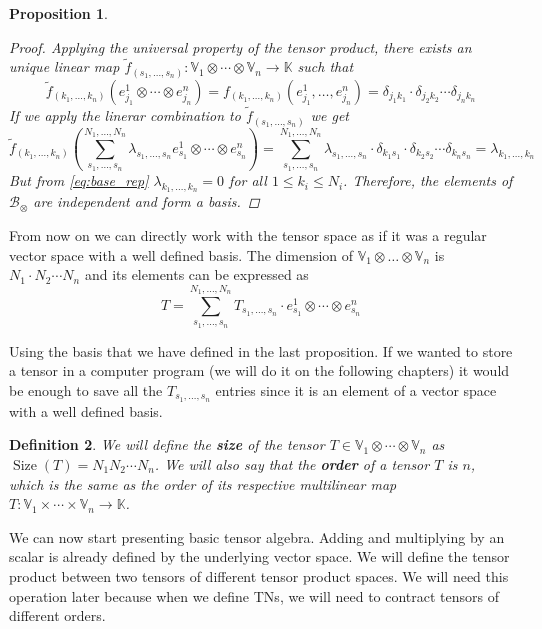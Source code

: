 \documentclass[11pt,a4paper,openright,oneside]{book}
\numberwithin{equation}{section}
\newtheorem{defn0}{Definition}[chapter]
\newtheorem{prop0}[defn0]{Proposition}
\newenvironment{definition}{ \begin{defn0}}{\end{defn0}}
\newenvironment{proposition}{\bigskip \begin{prop0}}{\end{prop0}}
\DeclareMathOperator{\size}{Size}
\begin{document}
\begin{proposition}
\begin{proof}
Applying the universal property of the tensor product, there exists an unique linear map $\tilde f_{(s_1, \dots, s_n)} : \mathbb{V}_1 \otimes \cdots \otimes \mathbb{V}_n \rightarrow \mathbb{K}$
such that
$$\tilde f_{(k_1, \dots, k_n)}(e_{j_1}^1 \otimes \cdots \otimes e_{j_n}^n) = f_{(k_1, \dots, k_n)}(e_{j_1}^1, \dots, e_{j_n}^n) = \delta_{j_1 k_1} \cdot \delta_{j_2 k_2} \cdots \delta_{j_n k_n}$$
If we apply the linerar combination to $\tilde f_{(s_1, \dots, s_n)}$ we get
$$\tilde f_{(k_1, \dots, k_n)} \left( 
\sum_{s_1, \dots, s_n}^{N_1, \dots, N_n} \lambda_{s_1, \dots, s_n} e_{s_1}^1 \otimes \cdots \otimes e_{s_n}^n 
\right) =  \sum_{s_1, \dots, s_n}^{N_1, \dots, N_n} \lambda_{s_1, \dots, s_n} \cdot \delta_{k_1 s_1} \cdot \delta_{k_2 s_2} \cdots \delta_{k_n s_n} = \lambda_{k_1, \dots, k_n}$$
But from \eqref{eq:base_rep} $\lambda_{k_1, \dots, k_n} = 0$ for all
$1 \leqslant k_i \leqslant N_i$. Therefore, the elements of $\mathcal{B}_\otimes$ are independent and form a basis.
\end{proof}
\end{proposition}


From now on we can directly work with the tensor space as if it was a regular vector space
with a well defined basis. The dimension
    of ${\mathbb{V}_1 \otimes \dots \otimes \mathbb{V}_n}$ is ${N_1 \cdot N_2 \cdots N_n}$ and its elements can be expressed as
    \begin{equation} \label{eq:base-representation}
T = \sum_{s_1, \dots, s_n}^{N_1, \dots, N_n} T_{s_1, \dots, s_n} \cdot  e_{s_1}^1 \otimes \cdots \otimes e_{s_n}^n
\end{equation}

Using the basis that we have defined in the last proposition. 
If we wanted to store a tensor in a computer program (we will do it on the following chapters) it would be enough to save all the $T_{s_1, \dots, s_n}$ entries
since it is an element of a vector space with a well defined basis.

\begin{definition}
We will define the \textbf{size} of the tensor $T \in \mathbb{V}_1 \otimes \cdots \otimes \mathbb{V}_n$ as $\size(T) = N_1 N_2 \cdots N_n$. We will 
also say that the \textbf{order} of a tensor $T$ is $n$, which is the same as the order of its respective multilinear map $T: \mathbb{V}_1 \times \cdots
\times \mathbb{V}_n \rightarrow \mathbb{K}$.
\end{definition}

We can now start presenting basic tensor algebra. Adding and multiplying by an scalar is already defined by the underlying
vector space. We will define the tensor product 
between two tensors of different tensor product spaces. We will need this operation
later because when we define \gls{TN}s, we will need to contract tensors of different orders.
\end{document}
